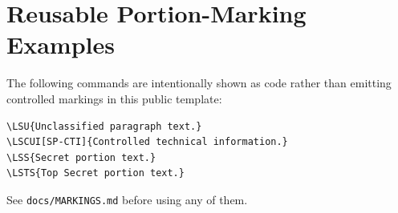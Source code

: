 \documentclass{linearspace-report}
\begin{document}
\printbibliography[heading=bibintoc]

\appendix
\chapter{Reusable Portion-Marking Examples}

The following commands are intentionally shown as code rather than emitting
controlled markings in this public template:
\begin{lstlisting}[language={[LaTeX]TeX}]
\LSU{Unclassified paragraph text.}
\LSCUI[SP-CTI]{Controlled technical information.}
\LSS{Secret portion text.}
\LSTS{Top Secret portion text.}
\end{lstlisting}
See \texttt{docs/MARKINGS.md} before using any of them.
\end{document}

